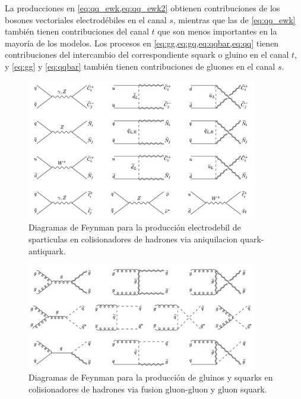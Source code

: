 La producciones en \cref{eq:qq_ewk,eq:qq_ewk2} obtienen contribuciones
de los bosones vectoriales electrodébiles en el canal $s$, mientras
que las de \cref{eq:qq_ewk} también tienen contribuciones del canal
$t$ que son menos importantes en la mayoría de los modelos. Los
procesos en \cref{eq:gg,eq:gq,eq:qqbar,eq:qq} tienen contribuciones
del intercambio del correspondiente squark o gluino en el canal $t$, y
\cref{eq:gg} y \cref{eq:qqbar} también tienen contribuciones de
gluones en el canal $s$.


\begin{figure}[h]
  \centering \includegraphics[width=0.9\textwidth]{figures/figure_101}
  \caption{Diagramas de Feynman para la producción electrodebil de
    sparticulas en colisionadores de hadrones via aniquilacion
    quark-antiquark.}
  \label{fig:ewkprod}
\end{figure}

\begin{figure}[h]
  \centering \includegraphics[width=0.9\textwidth]{figures/figure_102}
  \caption{Diagramas de Feynman para la producción de gluinos y
    squarks en colisionadores de hadrones via fusion gluon-gluon y
    gluon squark.}
  \label{fig:strongprod1}
\end{figure}

